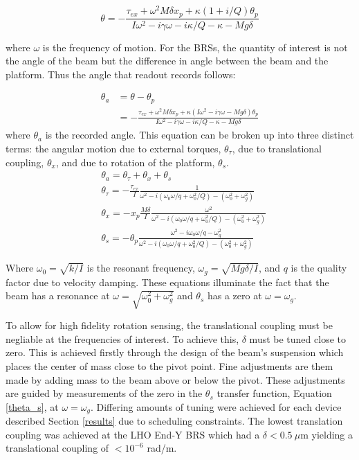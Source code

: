 \documentclass [12pt, proquest]{uwthesis}[2019]
\begin{document}
\begin{equation}
\theta = -\frac{\tau_{ex}+\omega^2 M \delta x_p+\kappa (1+i/Q) \theta_p}{I\omega^2-i \gamma \omega -i \kappa /Q-\kappa -Mg\delta}
\end{equation}

where $\omega$ is the frequency of motion. For the BRSs, the quantity of interest is not the angle of the beam but the difference in angle between the beam and the platform. Thus the angle that readout records follows:

\begin{align}
\theta_a &=\theta-\theta_p\\
&= -\frac{\tau_{ex}+\omega^2 M \delta x_p+\kappa (I\omega^2-i\gamma \omega -Mg\delta) \theta_p}{I\omega^2-i \gamma \omega -i \kappa /Q-\kappa -Mg\delta}
\end{align}
where $\theta_a$ is the recorded angle. This equation can be broken up into three distinct terms: the angular motion due to external torques, $\theta_\tau$, due to translational coupling, $\theta_x$, and due to rotation of the platform, $\theta_s$.
\begin{align}
&\theta_a =\theta_\tau+\theta_x+\theta_{s}\\
&\theta_\tau= -\frac{\tau_{ex}}{I}\frac{1}{\omega^2-i (\omega_0 \omega/q+\omega_0^2/Q)-(\omega_0^2+\omega_g^2)}\\
&\theta_x= -x_p\frac{M\delta}{I} \frac{\omega^2}{\omega^2-i (\omega_0 \omega/q+\omega_0^2/Q)-(\omega_0^2+\omega_g^2)}\\
&\theta_{s}= -\theta_p\frac{\omega^2-i\omega_0 \omega/q-\omega_g^2}{\omega^2-i (\omega_0 \omega/q+\omega_0^2/Q)-(\omega_0^2+\omega_g^2)}\label{theta_s}
\end{align}

Where $\omega_0=\sqrt{k/I}$ is the resonant frequency, $\omega_g=\sqrt{M g \delta/I}$, and $q$ is the quality factor due to velocity damping. These equations illuminate the fact that the beam has a resonance at $\omega=\sqrt{\omega_0^2+\omega_g^2}$ and $\theta_s$ has a zero at $\omega=\omega_g$. 

To allow for high fidelity rotation sensing, the translational coupling must be negliable at the frequencies of interest. To achieve this, $\delta$ must be tuned close to zero. This is achieved firstly through the design of the beam's suspension which places the center of mass close to the pivot point. Fine adjustments are them made by adding mass to the beam above or below the pivot. These adjustments are guided by measurements of the zero in the $\theta_s$ transfer function, Equation \ref{theta_s}, at $\omega=\omega_g$. Differing amounts of tuning were achieved for each device described Section \ref{results} due to scheduling constraints. The lowest translation coupling was achieved at the LHO End-Y BRS which had a $\delta<0.5\ \mu$m yielding a translational coupling of $<10^{-6}$ rad/m.
\end{document}
